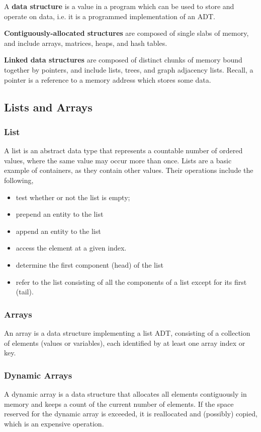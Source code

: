 \documentclass{article}
\begin{document}
    A \textbf{data structure} is a value in a program which can be used to store and operate on data, i.e. it is a programmed implementation of an ADT.
    
    \textbf{Contiguously-allocated structures} are composed of single slabs of memory, and include arrays, matrices, heaps, and hash tables.
     
    \textbf{Linked data structures} are composed of distinct chunks of memory bound together by pointers, and include lists, trees, and graph adjacency lists. Recall, a pointer is a reference to a memory address which stores some data.

    \subsection{Lists and Arrays}
    \subsubsection{List}
    A list is an abstract data type that represents a countable number of ordered values, where the same value may occur more than once. Lists are a basic example of containers, as they contain other values. Their operations include the following,
    \begin{itemize}
        \item test whether or not the list is empty;
        \item prepend an entity to the list
        \item append an entity to the list
        \item access the element at a given index.
        \item determine the first component (head) of the list
        \item refer to the list consisting of all the components of a list except for its first (tail).
    \end{itemize}
    
    \subsubsection{Arrays}
    An array is a data structure implementing a list ADT, consisting of a collection of elements (values or variables), each identified by at least one array index or key.
    
    \subsubsection{Dynamic Arrays}
    A dynamic array is a data structure that allocates all elements contiguously in memory and keeps a count of the current number of elements. If the space reserved for the dynamic array is exceeded, it is reallocated and (possibly) copied, which is an expensive operation.
    
\end{document}
